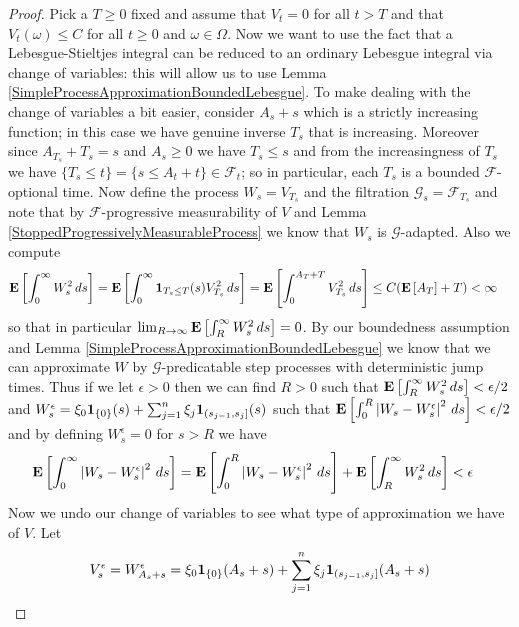 \begin{proof}
Pick a $T \geq 0$ fixed and assume that $V_t = 0$ for all $t > T$ and that $V_t(\omega) \leq C$ for all $t \geq 0$ and $\omega \in \Omega$.  Now we want to use the fact that a Lebesgue-Stieltjes integral can be reduced to an ordinary Lebesgue integral via change of variables: this will allow us to use Lemma \ref{SimpleProcessApproximationBoundedLebesgue}.  To make dealing with the change of variables a bit easier, consider $A_s + s$ which is a strictly increasing function; in this case we have genuine inverse $T_s$ that is increasing.  Moreover since $A_{T_s}+T_s = s$ and $A_s \geq 0$ we have $T_s \leq s$ and from the increasingness of $T_s$ we have $\lbrace T_s \leq t \rbrace = \lbrace s \leq A_t + t\rbrace \in \mathcal{F}_t$; so in particular, each $T_s$ is a bounded $\mathcal{F}$-optional time.  Now define the process $W_s = V_{T_s}$ and the filtration $\mathcal{G}_s = \mathcal{F}_{T_s}$ and note that by $\mathcal{F}$-progressive measurability of $V$ and Lemma \ref{StoppedProgressivelyMeasurableProcess} we know that $W_s$ is $\mathcal{G}$-adapted.  Also we compute
\begin{align*}
\textbf{E}\left[ \int_0^\infty W_s^2 \, ds\right] &= \textbf{E}\left[ \int_0^\infty \textbf{1}_{T_s \leq T} (s) V_{T_s}^2 \, ds\right] = \textbf{E}\left[ \int_0^{A_T + T} V_{T_s}^2 \, ds\right] \leq C ( \textbf{E}\left[A_T\right]+T) < \infty
\end{align*}
so that in particular $\lim_{R \to \infty} \textbf{E}\left[ \int_R^\infty W_s^2 \, ds\right] = 0$.  
By our boundedness assumption and Lemma  \ref{SimpleProcessApproximationBoundedLebesgue} we know that we can approximate $W$ by $\mathcal{G}$-predicatable step processes with deterministic jump times.  Thus if we let $\epsilon > 0$ then we can find $R>0$ such that $\textbf{E}\left[ \int_R^\infty W_s^2 \, ds\right] < \epsilon/2$ and $W^\epsilon_s = \xi_0 \textbf{1}_{\lbrace 0 \rbrace}(s) + \sum_{j=1}^n \xi_j \textbf{1}_{(s_{j-1}, s_j]}(s)$ such that 
$\textbf{E}\left[\int_0^R \left \vert W_s - W_s^\epsilon \right \vert^2 \, ds\right] < \epsilon/2$ and by defining $W^\epsilon_s = 0$ for $s > R$ we have
\begin{align*}
\textbf{E}\left[\int_0^\infty \left \vert W_s - W_s^\epsilon \right \vert^2 \, ds\right] &= \textbf{E}\left[\int_0^R \left \vert W_s - W_s^\epsilon \right \vert^2 \, ds\right]  + \textbf{E}\left[\int_R^\infty W_s^2 \, ds\right] < \epsilon
\end{align*}
Now we undo our change of variables to see what type of approximation we have of $V$.  Let 
\begin{align*}
V^\epsilon_s &= W^\epsilon_{A_s+s} = \xi_0 \characteristic{\lbrace 0 \rbrace}(A_s+s) + \sum_{j=1}^n \xi_j \characteristic{(s_{j-1}, s_j]}(A_s+s) \\

\end{align*}
\end{proof}
